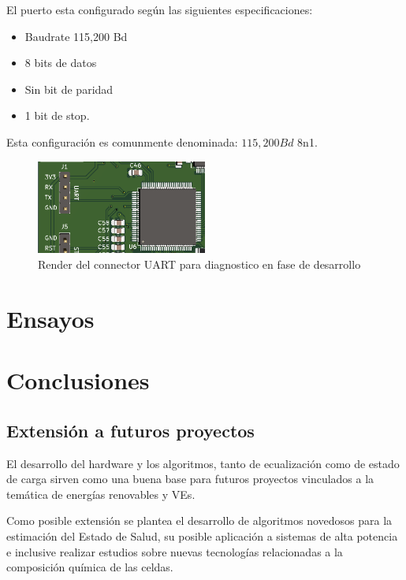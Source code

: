 \documentclass[10pt,a4paper]{article}
\begin{document}
El puerto esta configurado según las siguientes especificaciones:
\begin{itemize}
	\item Baudrate 115,200 Bd
	\item 8 bits de datos
	\item Sin bit de paridad
	\item 1 bit de stop.
\end{itemize}

Esta configuración es comunmente denominada: $115,200 Bd$ 8n1.

\begin{figure}[h!]
	\begin{center}
		\includegraphics[width=0.5\textwidth]{connector_UART.png}
		\caption{Render del connector UART para diagnostico en fase de desarrollo}
		\label{UART_Connector}
	\end{center}
\end{figure}
\FloatBarrier



\clearpage

\section{Ensayos}\label{ensayos}


\newpage

\section{Conclusiones}\label{conclusiones}

\subsection{Extensión a futuros proyectos}

El desarrollo del hardware y los algoritmos, tanto de ecualización como de
estado de carga sirven como una buena base para futuros proyectos vinculados a
la temática de energías renovables y \acrshort{VE}s.

Como posible extensión se plantea el desarrollo de algoritmos novedosos para la
estimación del Estado de Salud, su posible aplicación a sistemas de alta
potencia e inclusive realizar estudios sobre nuevas tecnologías relacionadas a
la composición química de las celdas.
\end{document}
